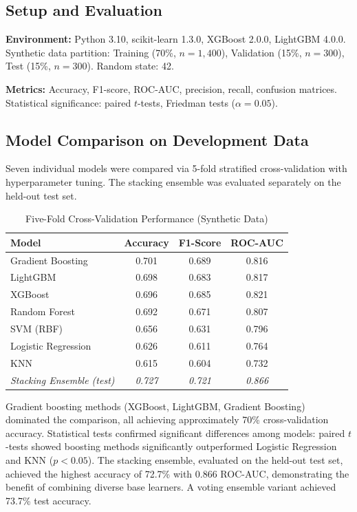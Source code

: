 \documentclass[11pt,a4paper]{article}
\begin{document}
\subsection{Setup and Evaluation}

\textbf{Environment:} Python 3.10, scikit-learn 1.3.0, XGBoost 2.0.0,
LightGBM 4.0.0. Synthetic data partition: Training (70\%, $n=1{,}400$),
Validation (15\%, $n=300$), Test (15\%, $n=300$). Random state: 42.

\textbf{Metrics:} Accuracy, F1-score, ROC-AUC, precision, recall, confusion matrices.
Statistical significance: paired $t$-tests, Friedman tests ($\alpha = 0.05$).

\subsection{Model Comparison on Development Data}

Seven individual models were compared via 5-fold stratified cross-validation with
hyperparameter tuning. The stacking ensemble was evaluated separately on the held-out
test set.

\begin{table}[H]
\centering
\caption{Five-Fold Cross-Validation Performance (Synthetic Data)}
\label{tab:cv}
\begin{tabular}{lccc}
\toprule
\textbf{Model} & \textbf{Accuracy} & \textbf{F1-Score} & \textbf{ROC-AUC} \\
\midrule
Gradient Boosting  & 0.701 & 0.689 & 0.816 \\
LightGBM           & 0.698 & 0.683 & 0.817 \\
XGBoost            & 0.696 & 0.685 & 0.821 \\
Random Forest      & 0.692 & 0.671 & 0.807 \\
SVM (RBF)          & 0.656 & 0.631 & 0.796 \\
Logistic Regression & 0.626 & 0.611 & 0.764 \\
KNN                & 0.615 & 0.604 & 0.732 \\
\midrule
\textit{Stacking Ensemble (test)} & \textit{0.727} & \textit{0.721} & \textit{0.866} \\
\bottomrule
\end{tabular}
\end{table}

Gradient boosting methods (XGBoost, LightGBM, Gradient Boosting) dominated the
comparison, all achieving approximately 70\% cross-validation accuracy. Statistical
tests confirmed significant differences among models: paired $t$-tests showed boosting
methods significantly outperformed Logistic Regression and KNN ($p < 0.05$). The
stacking ensemble, evaluated on the held-out test set, achieved the highest accuracy
of 72.7\% with 0.866 ROC-AUC, demonstrating the benefit of combining diverse
base learners. A voting ensemble variant achieved 73.7\% test accuracy.
\end{document}
